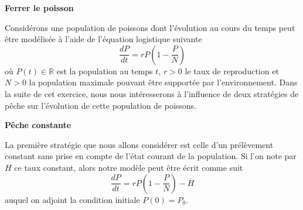 \documentclass[12pt]{exam}
\begin{document}
\begin{questions}

  \question[10] \textbf{Ferrer le poisson}
  \noaddpoints
  
  Considérons une population de poissons dont l'évolution au cours du temps peut être modélisée à l'aide de l'équation logistique suivante
  \[
  \dfrac{dP}{dt} = r P \left( 1 - \dfrac{P}{N} \right)
  \]
  où $P(t) \in \mathbb{R}$ est la population au temps $t$, $r > 0$ le taux de reproduction et $N > 0$ la population maximale pouvant être supportée par l'environnement.
  Dans la suite de cet exercice, nous nous intéresserons à l'influence de deux stratégies de pêche sur l'évolution de cette population de poissons.

  \textbf{Pêche constante}

  La première stratégie que nous allons considérer est celle d'un prélèvement constant sans prise en compte de l'état  courant de la population.
  Si l'on note par $H$ ce taux constant, alors notre modèle peut être écrit comme suit
  \[
  \dfrac{dP}{dt} = r P \left( 1 - \dfrac{P}{N} \right) - H
  \]
  auquel on adjoint la condition initiale $P(0) = P_0$.



\end{questions}
\end{document}
